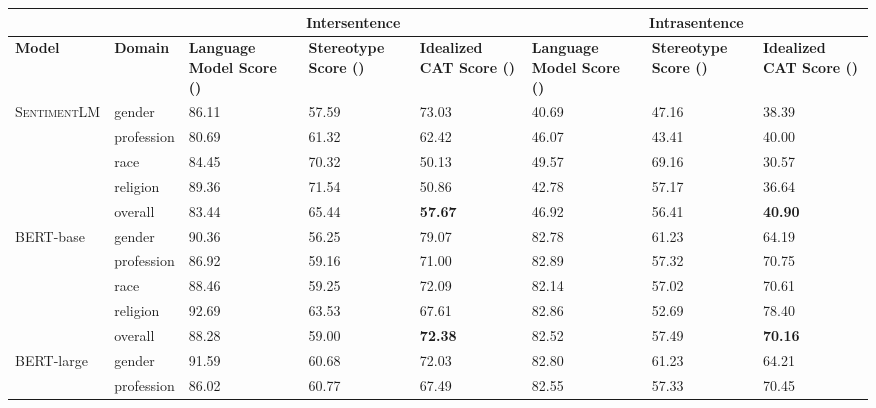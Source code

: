 \documentclass[11pt,a4paper]{article}
\newcommand \bert{\textsc{BERT}\xspace}
\newcommand \sentimentlm{\textsc{SentimentLM}\xspace}
\begin{document}
\begin{table*}[]
\centering
\begin{adjustbox}{totalheight=\textheight}
\begin{tabular}{llp{5em}p{5em}p{5em}p{5em}p{5em}p{5em}}
\toprule
& & \multicolumn{3}{c}{\textbf{Intersentence}} & \multicolumn{3}{c}{\textbf{Intrasentence}} \\
\midrule
\textbf{Model} & \textbf{Domain} & \textbf{Language Model Score ()} & \textbf{Stereotype Score ()} & \textbf{Idealized CAT Score ()} & 
\textbf{Language Model Score ()} & \textbf{Stereotype Score ()} & \textbf{Idealized CAT Score ()}
\\ \midrule \sentimentlm & gender & 86.11 & 57.59 & 73.03 & 40.69 & 47.16 & 38.39 \\
 & profession & 80.69 & 61.32 & 62.42 & 46.07 & 43.41 & 40.00 \\
 & race & 84.45 & 70.32 & 50.13 & 49.57 & 69.16 & 30.57 \\                                                                                                                                                                                     & religion & 89.36 & 71.54 & 50.86 & 42.78 & 57.17 & 36.64 \\
\textit{} & \cellcolor[HTML]{ECF4FF}overall & \cellcolor[HTML]{ECF4FF}83.44 & \cellcolor[HTML]{ECF4FF}65.44 & \cellcolor[HTML]{ECF4FF}\textbf{57.67} & \cellcolor[HTML]{ECF4FF}46.92 & \cellcolor[HTML]{ECF4FF}56.41 & \cellcolor[HTML]{ECF4FF
}\textbf{40.90}\\
\bert-base & gender & 90.36 & 56.25 & 79.07 & 82.78 & 61.23 & 64.19 \\
 & profession & 86.92 & 59.16 & 71.00 & 82.89 & 57.32 & 70.75 \\
 & race & 88.46 & 59.25 & 72.09 & 82.14 & 57.02 & 70.61 \\                                                                                                                                                                                     & religion & 92.69 & 63.53 & 67.61 & 82.86 & 52.69 & 78.40 \\
\textit{} & \cellcolor[HTML]{ECF4FF}overall & \cellcolor[HTML]{ECF4FF}88.28 & \cellcolor[HTML]{ECF4FF}59.00 & \cellcolor[HTML]{ECF4FF}\textbf{72.38} & \cellcolor[HTML]{ECF4FF}82.52 & \cellcolor[HTML]{ECF4FF}57.49 & \cellcolor[HTML]{ECF4FF
}\textbf{70.16}\\
\bert-large & gender & 91.59 & 60.68 & 72.03 & 82.80 & 61.23 & 64.21 \\
 & profession & 86.02 & 60.77 & 67.49 & 82.55 & 57.33 & 70.45 \\

\end{tabular}
\end{adjustbox}
\end{table*}
\end{document}
